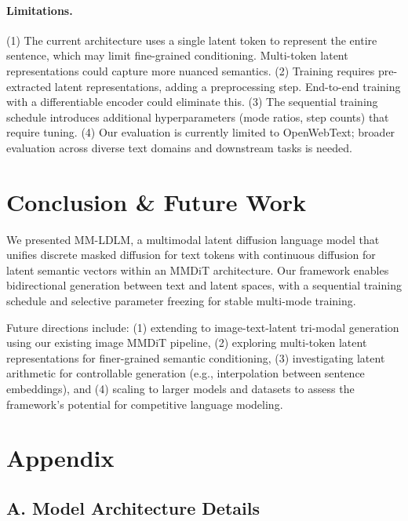 \documentclass{article}
\begin{document}
\paragraph{Limitations.} 
(1) The current architecture uses a single latent token to represent the entire sentence, which may limit fine-grained conditioning. Multi-token latent representations could capture more nuanced semantics.
(2) Training requires pre-extracted latent representations, adding a preprocessing step. End-to-end training with a differentiable encoder could eliminate this.
(3) The sequential training schedule introduces additional hyperparameters (mode ratios, step counts) that require tuning.
(4) Our evaluation is currently limited to OpenWebText; broader evaluation across diverse text domains and downstream tasks is needed.

\section{Conclusion \& Future Work}\label{sec:conclusion}

We presented MM-LDLM, a multimodal latent diffusion language model that unifies discrete masked diffusion for text tokens with continuous diffusion for latent semantic vectors within an MMDiT architecture. Our framework enables bidirectional generation between text and latent spaces, with a sequential training schedule and selective parameter freezing for stable multi-mode training.

Future directions include: (1) extending to image-text-latent tri-modal generation using our existing image MMDiT pipeline, (2) exploring multi-token latent representations for finer-grained semantic conditioning, (3) investigating latent arithmetic for controllable generation (e.g., interpolation between sentence embeddings), and (4) scaling to larger models and datasets to assess the framework's potential for competitive language modeling.

\newpage



\newpage
\section*{Appendix}

\subsection*{A. Model Architecture Details}
\end{document}
